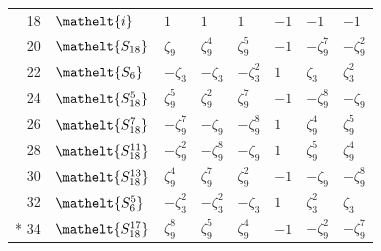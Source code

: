 \documentclass[10pt,a4paper]{article}
\numberwithin{equation}{section}
\newcommand{\eltfont}[1]{{\let\sigma\eltsigma\mathelt{#1}}}
\newcommand{\cls}[1]{\eltfont{#1}}
\newcommand{\rootunity}[1]{\zeta_{#1}}
\begin{document}
{\begin{longtable}{@{}rlllllll@{}}
18 & $\cls{i}$ & $1$ & $1$ & $1$ & $-1$ & $-1$ & $-1$\\
20 & $\cls{S_{18}}$ & $\rootunity{9}$ & $\rootunity{9}^{4}$ & $\rootunity{9}^{5}$ & $-1$ & $-\rootunity{9}^{7}$ & $-\rootunity{9}^{2}$\\
22 & $\cls{S_{6}}$ & $-\rootunity{3}$ & $-\rootunity{3}$ & $-\rootunity{3}^{2}$ & $1$ & $\rootunity{3}$ & $\rootunity{3}^{2}$\\
24 & $\cls{S_{18}^{5}}$ & $\rootunity{9}^{5}$ & $\rootunity{9}^{2}$ & $\rootunity{9}^{7}$ & $-1$ & $-\rootunity{9}^{8}$ & $-\rootunity{9}$\\
26 & $\cls{S_{18}^{7}}$ & $-\rootunity{9}^{7}$ & $-\rootunity{9}$ & $-\rootunity{9}^{8}$ & $1$ & $\rootunity{9}^{4}$ & $\rootunity{9}^{5}$\\
28 & $\cls{S_{18}^{11}}$ & $-\rootunity{9}^{2}$ & $-\rootunity{9}^{8}$ & $-\rootunity{9}$ & $1$ & $\rootunity{9}^{5}$ & $\rootunity{9}^{4}$\\
30 & $\cls{S_{18}^{13}}$ & $\rootunity{9}^{4}$ & $\rootunity{9}^{7}$ & $\rootunity{9}^{2}$ & $-1$ & $-\rootunity{9}$ & $-\rootunity{9}^{8}$\\
32 & $\cls{S_{6}^{5}}$ & $-\rootunity{3}^{2}$ & $-\rootunity{3}^{2}$ & $-\rootunity{3}$ & $1$ & $\rootunity{3}^{2}$ & $\rootunity{3}$\\*
34 & $\cls{S_{18}^{17}}$ & $\rootunity{9}^{8}$ & $\rootunity{9}^{5}$ & $\rootunity{9}^{4}$ & $-1$ & $-\rootunity{9}^{2}$ & $-\rootunity{9}^{7}$\\
\bottomrule\end{longtable}}
\end{document}
